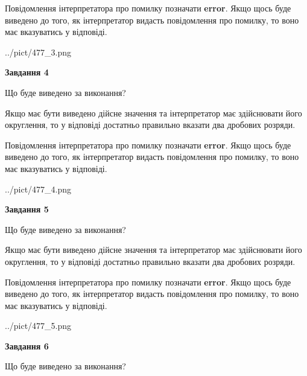 \documentclass[12pt, ukrainian]{article}
\begin{document}
{\begin {Large}
Повідомлення інтерпретатора про помилку позначати \textbf{error}.
Якщо щось буде виведено до того, як інтерпретатор видасть повідомлення про помилку, 
то воно має вказуватись у відповіді. \par

\begin{center}
	{../pict/477_3.png}
\end{center}
\newpage

{\begin {center}\textbf{Завдання 4}\end {center}}\par
Що буде виведено за виконання? \par

Якщо має бути виведено дійсне значення та інтерпретатор має здійснювати його округлення, 
то у відповіді достатньо правильно вказати два дробових розряди.

Повідомлення інтерпретатора про помилку позначати \textbf{error}.
Якщо щось буде виведено до того, як інтерпретатор видасть повідомлення про помилку, 
то воно має вказуватись у відповіді. \par

\begin{center}
	{../pict/477_4.png}
\end{center}
\newpage

{\begin {center}\textbf{Завдання 5}\end {center}}\par
Що буде виведено за виконання? \par

Якщо має бути виведено дійсне значення та інтерпретатор має здійснювати його округлення, 
то у відповіді достатньо правильно вказати два дробових розряди.

Повідомлення інтерпретатора про помилку позначати \textbf{error}.
Якщо щось буде виведено до того, як інтерпретатор видасть повідомлення про помилку, 
то воно має вказуватись у відповіді. \par

\begin{center}
	{../pict/477_5.png}
\end{center}
\newpage

{\begin {center}\textbf{Завдання 6}\end {center}}\par
Що буде виведено за виконання? \par


\end{Large}}
\end{document}
